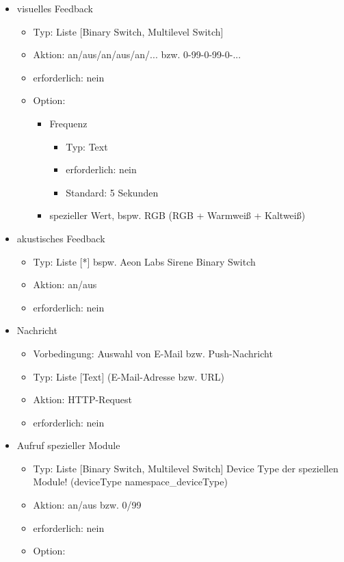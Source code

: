 \begin{itemize}
	\item visuelles Feedback
	\begin{itemize}
		\item Typ: Liste [Binary Switch, Multilevel Switch]
		\item Aktion: an/aus/an/aus/an/... bzw. 0-99-0-99-0-...
		\item erforderlich: nein
		\item Option:
		\begin{itemize}
			\item Frequenz
			\begin{itemize}
				\item Typ: Text
				\item erforderlich: nein
				\item Standard: 5 Sekunden
			\end{itemize}
		\item spezieller Wert, bspw. RGB (RGB + Warmweiß + Kaltweiß)
		\end{itemize}
	\end{itemize}
	\item akustisches Feedback
	\begin{itemize}
		\item Typ: Liste [*] \textrightarrow{ }bspw. Aeon Labs Sirene \textrightarrow{ }Binary Switch
		\item Aktion: an/aus
		\item erforderlich: nein
	\end{itemize}
	\item Nachricht
	\begin{itemize}
		\item Vorbedingung: Auswahl von E-Mail bzw. Push-Nachricht
		\item Typ: Liste [Text] (E-Mail-Adresse bzw. URL)
		\item Aktion: HTTP-Request
		\item erforderlich: nein
	\end{itemize}
	\item Aufruf spezieller Module
	\begin{itemize}
		\item Typ: Liste [Binary Switch, Multilevel Switch] \textrightarrow{ }Device Type der speziellen Module! (deviceType \textrightarrow{ }namespace\_deviceType)
		\item Aktion: an/aus bzw. 0/99
		\item erforderlich: nein
		\item Option:

\end{itemize}
\end{itemize}
